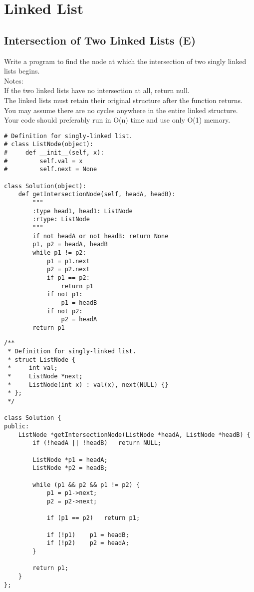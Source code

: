 \chapter{Linked List}
\section{Intersection of Two Linked Lists (E)}
Write a program to find the node at which the intersection of two singly linked lists begins.\\

Notes:\\
    If the two linked lists have no intersection at all, return null.\\
    The linked lists must retain their original structure after the function returns.\\
    You may assume there are no cycles anywhere in the entire linked structure.\\
    Your code should preferably run in O(n) time and use only O(1) memory.\\
 
 \begin{lstlisting}
# Definition for singly-linked list.
# class ListNode(object):
#     def __init__(self, x):
#         self.val = x
#         self.next = None

class Solution(object):
    def getIntersectionNode(self, headA, headB):
        """
        :type head1, head1: ListNode
        :rtype: ListNode
        """
        if not headA or not headB: return None
        p1, p2 = headA, headB
        while p1 != p2:
            p1 = p1.next
            p2 = p2.next
            if p1 == p2:
                return p1
            if not p1:
                p1 = headB
            if not p2:
                p2 = headA
        return p1
\end{lstlisting}
 
\begin{lstlisting}
/**
 * Definition for singly-linked list.
 * struct ListNode {
 *     int val;
 *     ListNode *next;
 *     ListNode(int x) : val(x), next(NULL) {}
 * };
 */
 
class Solution {
public:
    ListNode *getIntersectionNode(ListNode *headA, ListNode *headB) {
        if (!headA || !headB)   return NULL;
        
        ListNode *p1 = headA;
        ListNode *p2 = headB;
        
        while (p1 && p2 && p1 != p2) {
            p1 = p1->next;
            p2 = p2->next;
            
            if (p1 == p2)   return p1;
            
            if (!p1)    p1 = headB;
            if (!p2)    p2 = headA;
        }
        
        return p1;
    }
};
\end{lstlisting}


